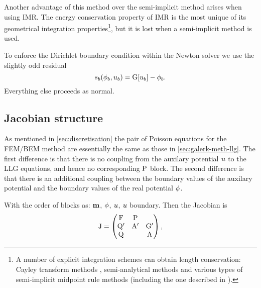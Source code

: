 Another advantage of this method over the semi-implicit method arises when using IMR.
The energy conservation property of IMR is the most unique of its geometrical integration properties\footnote{A number of explicit integration schemes can obtain length conservation: Cayley transform methods \cite{Lewis2003}, semi-analytical methods \cite{Wiele2010} and various types of semi-implicit midpoint rule methods \cite{Spargo2003} \cite{Mentink2010} (including the one described in ).}, but it is lost when a semi-implicit method is used.

To enforce the Dirichlet boundary condition within the Newton solver we use the slightly odd residual
\newcommand{\rphimb}{\rphi_b}
\begin{equation}
  \rphimb(\phim_b, \phione_b) = \bm[\phione_b] - \phim_b.
\end{equation}
Everything else proceeds as normal.


\subsection{Jacobian structure}
\label{sec:bem-jacobian-structure}

As mentioned in \cref{sec:discretisation} the pair of Poisson equations for the FEM/BEM method are essentially the same as those in \cref{sec:galerk-meth-llg}.
The first difference is that there is no coupling from the auxilary potential $u$ to the LLG equations, and hence no corresponding $\mathrm{P}$ block.
The second difference is that there is an additional coupling between the boundary values of the auxilary potential and the boundary values of the real potential $\phi$.

With the order of blocks as: $\mathbf{m}$, $\phi$, $u$, $u$ boundary.
Then the Jacobian is
\begin{equation}
  \mathrm{J} = 
  \begin{pmatrix}
    \mathrm{F}       & \mathrm{P}     &  \\
    \mathrm{Q}'      & \mathrm{A}' &  {\mathbf{\mathrm{G}}}'  \\
    \mathrm{Q}       &         &   \mathrm{A}
  \end{pmatrix},
\end{equation}



